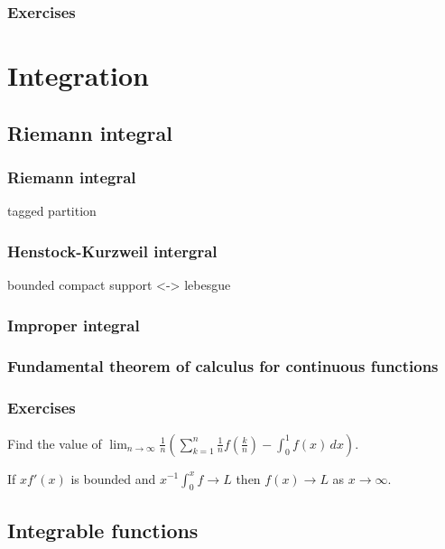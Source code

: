 \documentclass{../note}
\begin{document}
\section*{Exercises}



\part{Integration}

\chapter{Riemann integral}
\section{Riemann integral}
tagged partition
\section{Henstock-Kurzweil intergral}
bounded compact support <-> lebesgue
\section{Improper integral}
\section{Fundamental theorem of calculus for continuous functions}

\section*{Exercises}
\begin{prb}
Find the value of $\lim_{n\to\infty}\frac1n\left(\sum_{k=1}^n\frac1nf\left(\frac kn\right)-\int_0^1f(x)\,dx\right)$.
\end{prb}

\begin{prb}
If $xf'(x)$ is bounded and $x^{-1}\int_0^xf\to L$ then $f(x)\to L$ as $x\to\infty$.
\end{prb}


\chapter{Integrable functions}
\section{}
\end{document}
